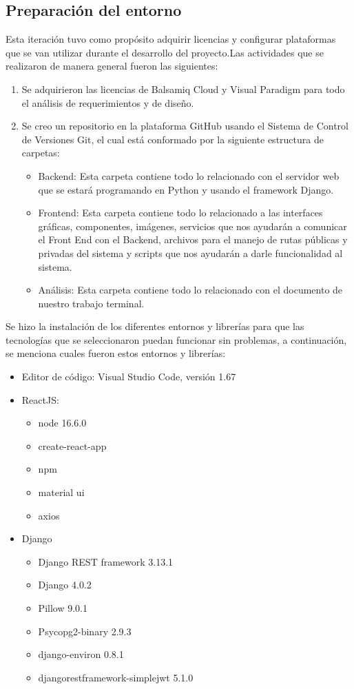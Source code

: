 \subsection{Preparación del entorno}
    Esta iteración tuvo como propósito adquirir licencias y configurar plataformas que se van utilizar
    durante el desarrollo del proyecto.Las actividades que se realizaron de manera general fueron las siguientes:
    \begin{enumerate}
        \item Se adquirieron las licencias de Balsamiq Cloud y Visual Paradigm  para todo el análisis de
        requerimientos y de diseño.
        \item Se creo un repositorio en la plataforma GitHub usando el Sistema de Control de Versiones Git, el cual está conformado por la siguiente estructura de carpetas:
        \begin{itemize}
            \item Backend: Esta carpeta contiene todo lo relacionado con el servidor web que se estará programando en Python y usando el framework Django.
            \item Frontend: Esta carpeta contiene todo lo relacionado a las interfaces gráficas, componentes, imágenes, servicios que nos ayudarán a comunicar el Front End con el Backend, archivos para el manejo de rutas públicas y privadas del sistema y scripts que nos ayudarán a darle funcionalidad al sistema.
            \item Análisis:  Esta carpeta contiene todo lo relacionado con el documento de nuestro trabajo terminal.
        \end{itemize}
    \end{enumerate}

    Se hizo la instalación de los diferentes entornos y librerías para que las tecnologías que se seleccionaron puedan funcionar sin problemas, a continuación, se menciona cuales fueron estos entornos y librerías:
\begin{itemize}
    \item Editor de código:  Visual Studio Code, versión 1.67
\item ReactJS:
\begin{itemize}
    \item node 16.6.0
    \item create-react-app
    \item npm
    \item material ui
    \item axios
\end{itemize}
\item Django
\begin{itemize}
    \item Django REST framework 3.13.1
    \item Django 4.0.2
    \item Pillow 9.0.1
    \item Psycopg2-binary 2.9.3
    \item django-environ 0.8.1
    \item djangorestframework-simplejwt 5.1.0
\end{itemize}
\end{itemize}
